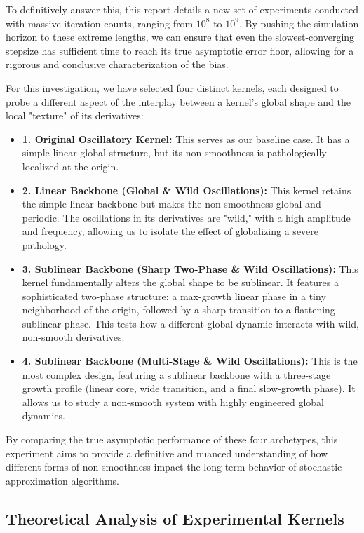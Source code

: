 \documentclass[a4paper]{article}
\begin{document}
To definitively answer this, this report details a new set of experiments conducted with massive iteration counts, ranging from $10^8$ to $10^9$. By pushing the simulation horizon to these extreme lengths, we can ensure that even the slowest-converging stepsize has sufficient time to reach its true asymptotic error floor, allowing for a rigorous and conclusive characterization of the bias.

For this investigation, we have selected four distinct kernels, each designed to probe a different aspect of the interplay between a kernel's global shape and the local "texture" of its derivatives:
\begin{itemize}
	\item \textbf{1. Original Oscillatory Kernel:} This serves as our baseline case. It has a simple linear global structure, but its non-smoothness is pathologically localized at the origin.
	
	\item \textbf{2. Linear Backbone (Global \& Wild Oscillations):} This kernel retains the simple linear backbone but makes the non-smoothness global and periodic. The oscillations in its derivatives are "wild," with a high amplitude and frequency, allowing us to isolate the effect of globalizing a severe pathology.
	
	\item \textbf{3. Sublinear Backbone (Sharp Two-Phase \& Wild Oscillations):} This kernel fundamentally alters the global shape to be sublinear. It features a sophisticated two-phase structure: a max-growth linear phase in a tiny neighborhood of the origin, followed by a sharp transition to a flattening sublinear phase. This tests how a different global dynamic interacts with wild, non-smooth derivatives.
	
	\item \textbf{4. Sublinear Backbone (Multi-Stage \& Wild Oscillations):} This is the most complex design, featuring a sublinear backbone with a three-stage growth profile (linear core, wide transition, and a final slow-growth phase). It allows us to study a non-smooth system with highly engineered global dynamics.
\end{itemize}

By comparing the true asymptotic performance of these four archetypes, this experiment aims to provide a definitive and nuanced understanding of how different forms of non-smoothness impact the long-term behavior of stochastic approximation algorithms.

\subsection*{Theoretical Analysis of Experimental Kernels}
\end{document}
